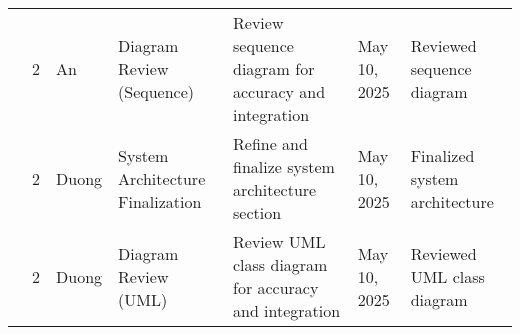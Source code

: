 \documentclass[11pt]{article}
\begin{document}
\begin{longtable}{|p{}|p{}|p{}|p{}|p{}|p{}|p{}|}
\rowcolor{week4color} 
& 2& An & Diagram Review (Sequence) & Review sequence diagram for accuracy and integration & May 10, 2025 & Reviewed sequence diagram \\
\rowcolor{week4color} 
& 2& Duong & System Architecture Finalization & Refine and finalize system architecture section & May 10, 2025 & Finalized system architecture \\
\rowcolor{week4color} 
& 2& Duong & Diagram Review (UML) & Review UML class diagram for accuracy and integration & May 10, 2025 & Reviewed UML class diagram \\
\hline

\end{longtable}
\end{document}
